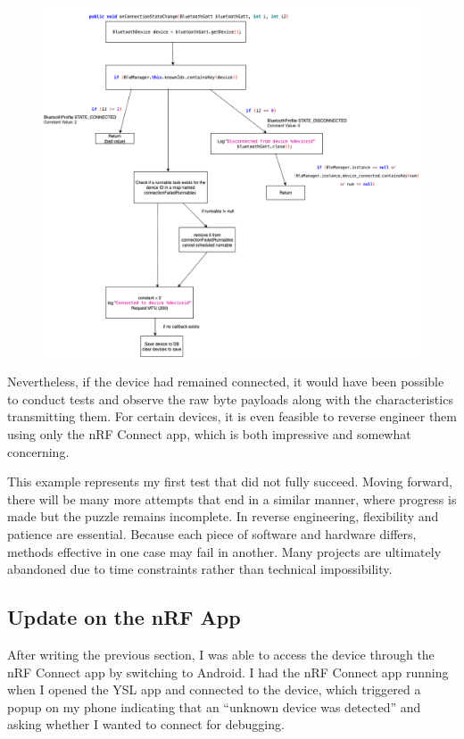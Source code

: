 \begin{figure}[H]
	\centering
	\includegraphics[scale=.5]{statemachineonconnection}
	\caption{}
	\label{fig:statemachineonconnection}
\end{figure}

Nevertheless, if the device had remained connected, it would have been possible to conduct tests and observe the raw byte payloads along with the characteristics transmitting them. For certain devices, it is even feasible to reverse engineer them using only the nRF Connect app, which is both impressive and somewhat concerning.

This example represents my first test that did not fully succeed. Moving forward, there will be many more attempts that end in a similar manner, where progress is made but the puzzle remains incomplete. In reverse engineering, flexibility and patience are essential. Because each piece of software and hardware differs, methods effective in one case may fail in another. Many projects are ultimately abandoned due to time constraints rather than technical impossibility.

\subsection{Update on the nRF App}
After writing the previous section, I was able to access the device through the nRF Connect app by switching to Android. I had the nRF Connect app running when I opened the YSL app and connected to the device, which triggered a popup on my phone indicating that an “unknown device was detected” and asking whether I wanted to connect for debugging. 

